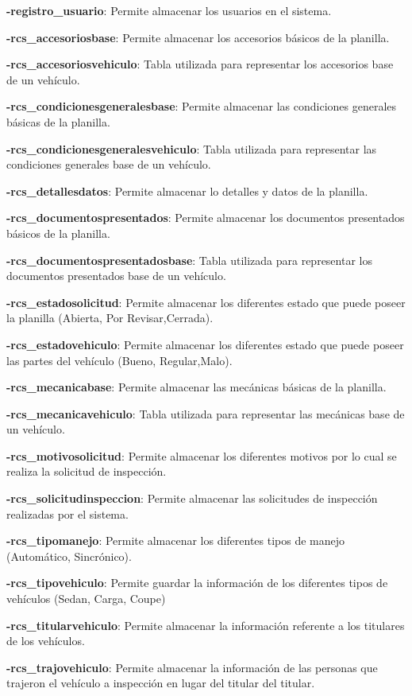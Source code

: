 \textbf{-registro\_usuario}: Permite almacenar los usuarios en el sistema.

\textbf{-rcs\_accesoriosbase}: Permite almacenar los accesorios básicos de la planilla.

\textbf{-rcs\_accesoriosvehiculo}: Tabla utilizada para representar los accesorios base de un vehículo.

\textbf{-rcs\_condicionesgeneralesbase}: Permite almacenar las condiciones generales básicas de la planilla.

\textbf{-rcs\_condicionesgeneralesvehiculo}: Tabla utilizada para representar las condiciones generales base de un vehículo.

\textbf{-rcs\_detallesdatos}: Permite almacenar lo detalles y datos de la planilla.

\textbf{-rcs\_documentospresentados}: Permite almacenar los documentos presentados básicos de la planilla.

\textbf{-rcs\_documentospresentadosbase}: Tabla utilizada para representar los documentos presentados base de un vehículo.

\textbf{-rcs\_estadosolicitud}: Permite almacenar los diferentes estado que puede poseer la planilla (Abierta, Por Revisar,Cerrada).

\textbf{-rcs\_estadovehiculo}: Permite almacenar los diferentes estado que puede poseer las partes del vehículo (Bueno, Regular,Malo).

\textbf{-rcs\_mecanicabase}: Permite almacenar las mecánicas básicas de la planilla.

\textbf{-rcs\_mecanicavehiculo}: Tabla utilizada para representar las mecánicas base de un vehículo.

\textbf{-rcs\_motivosolicitud}: Permite almacenar los diferentes motivos por lo cual se realiza la solicitud de inspección.

\textbf{-rcs\_solicitudinspeccion}: Permite almacenar las solicitudes de inspección realizadas por el sistema.

\textbf{-rcs\_tipomanejo}: Permite almacenar los diferentes tipos de manejo (Automático, Sincrónico).

\textbf{-rcs\_tipovehiculo}: Permite guardar la información de los diferentes tipos de vehículos (Sedan, Carga, Coupe)

\textbf{-rcs\_titularvehiculo}: Permite almacenar la información referente a los titulares de los vehículos.

\textbf{-rcs\_trajovehiculo}: Permite almacenar la información de las personas que trajeron el vehículo a inspección en lugar del titular del titular.

